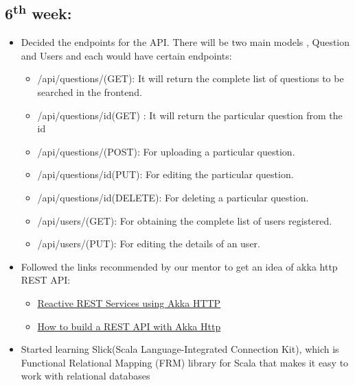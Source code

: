\documentclass{article}
\begin{document}
\subsection*{6\textsuperscript{th} week:}
\begin{itemize} 

   \item Decided the endpoints for the API. There will be two main models , Question and Users and each would have certain endpoints:
        \begin{itemize}
            \item /api/questions/(GET): It will return the complete list of questions to be searched in the frontend.
            \item /api/questions/id(GET) : It will return the particular question from the id
            \item /api/questions/(POST): For uploading a particular question.
            \item /api/questions/id(PUT): For editing the particular question.
			\item /api/questions/id(DELETE): For deleting a particular question.
            \item /api/users/(GET): For obtaining the complete list of users registered.
            \item /api/users/(PUT): For editing the details of an user.
        \end{itemize}
  
    \item Followed the links recommended by our mentor to get an idea of akka http REST API:
        \begin{itemize}
            \item \href{https://spindance.com/reactive-rest-services-akka-http/}{Reactive REST Services using Akka HTTP}
            \item \href{https://danielasfregola.com/2016/02/07/how-to-build-a-rest-api-with-akka-http/}{How to build a REST API with Akka Http}
    \end{itemize}



    \item Started learning Slick(Scala Language-Integrated Connection Kit), which is Functional Relational Mapping (FRM) library for Scala that makes it easy to work with relational databases
\end{itemize}
    
\end{document}
